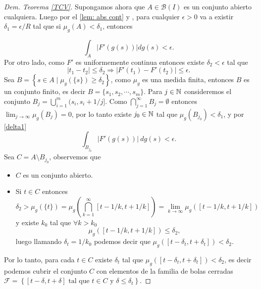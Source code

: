 \begin{proof}[Dem. Teorema \eqref{TCV}]
Supongamos ahora que  $A\in \mathcal{B}(I)$ es un conjunto abierto cualquiera. Luego por el  \ref{lem: abs cont} y   \cite[Teorema 3.5]{folland}, para cualquier $\epsilon>0$ va a existir $\delta_1=\epsilon/R$ tal que si $\mu_g(A)< \delta_1$, entonces


\begin{equation}
 \int_{A}|F'(g(s))|dg(s)< \epsilon. \label{delta1}
\end{equation}
Por otro lado, como $F'$ es uniformemente continua entonces existe $\delta_2<\epsilon$ tal que 
	\begin{equation}
		|t_1-t_2|\leq  \delta_2\Rightarrow |F'(t_1)-F'(t_2)|\leq \epsilon. \label{delta2}
	\end{equation}
	Sea $B=\left\lbrace s\in A \mid \mu_{g}(\{s\})\geq \delta_2\right\rbrace $, como $\mu_{g}$ es una medida finita, entonces $B$ es un conjunto finito, es decir $B=\{s_1,s_2,\cdots,s_m\}$. Para $j\in\mathbb{N}$ consideremos el conjunto $\displaystyle B_j=\bigcup_{i=1}^{m}(s_i, s_i+1/j]$. Como $\displaystyle \bigcap_{j=1}^{\infty}B_j=\emptyset$ entonces $\displaystyle \lim_{j\to\infty}\mu_{g}(B_j)=0$, por lo tanto existe $j_0\in \mathbb{N}$ tal que $\mu_{g}(B_{j_0})<\delta_1$, y por \eqref{delta1} $$\int_{B_{j_0}}|F'(g(s))|\: dg(s)< \epsilon. $$
	Sea $C=A\setminus{B_{j_0}}$, observemos que
	\begin{itemize}
		\item $C$ es un conjunto abierto. 
		\item Si $t\in C$ entonces
	$$\delta_2>\mu_{g}(\{t\})=\mu_{g}\left( \bigcap_{k=1}^{\infty}[t-1/k,t+1/k] \right)=\lim\limits_{k\to\infty}\mu_{g}\left([t-1/k,t+1/k] \right) $$
y existe $k_0$ tal que $\forall k>k_0$
	$$\mu_{g}\left([t-1/k,t+1/k] \right)\leq \delta_2,$$
	luego llamando $\delta_t=1/k_0$ podemos decir que $\mu_{g}\left([t-\delta_t,t+\delta_t] \right)<\delta_2$.
		\end{itemize}  
	Por lo tanto, para cada $t\in C$ existe $\delta_t$ tal que $\mu_{g}\left([t-\delta_t,t+\delta_t] \right)<\delta_2$, es decir podemos cubrir el conjunto $C$ con elementos de la familia de bolas cerradas $\mathcal{F}=\left\lbrace [t-\delta,t+\delta] \text{ tal que } t\in C \text{ y }\delta\leq \delta_t\right\rbrace .$


\end{proof}
